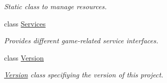\begin{DoxyCompactItemize}
\begin{DoxyCompactList}\small\item\em Static class to manage resources. \end{DoxyCompactList}\item 
class \hyperlink{class_tri_devs_1_1_tri_engine2_d_1_1_services}{Services}
\begin{DoxyCompactList}\small\item\em Provides different game-\/related service interfaces. \end{DoxyCompactList}\item 
class \hyperlink{class_tri_devs_1_1_tri_engine2_d_1_1_version}{Version}
\begin{DoxyCompactList}\small\item\em \hyperlink{class_tri_devs_1_1_tri_engine2_d_1_1_version}{Version} class specifiying the version of this project. \end{DoxyCompactList}\end{DoxyCompactItemize}
